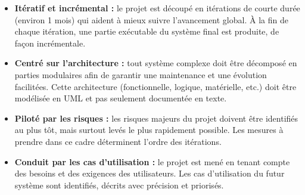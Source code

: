     \begin{itemize}
        \item [\textbullet] \textbf{Itératif et incrémental :}
            le projet est découpé en itérations de courte durée (environ 1 mois) qui aident à mieux suivre l’avancement global. À la fin de chaque itération, une partie exécutable du système final est produite, de façon incrémentale.
        \item [\textbullet] \textbf{Centré sur l’architecture :}
            tout système complexe doit être décomposé en parties modulaires afin de garantir une maintenance et une évolution facilitées. Cette architecture (fonctionnelle, logique, matérielle, etc.) doit être modélisée en UML et pas seulement documentée en texte.
        \item [\textbullet] \textbf{Piloté par les risques :}
            les risques majeurs du projet doivent être identifiés au plus tôt, mais surtout levés le plus rapidement possible. Les mesures à prendre dans ce cadre déterminent l’ordre des itérations.
        \item [\textbullet] \textbf{Conduit par les cas d’utilisation :}
            le projet est mené en tenant compte des besoins et des exigences des utilisateurs. Les cas d’utilisation du futur système sont identifiés, décrits avec précision et priorisés.
            \cite{5}
    \end{itemize}
    
